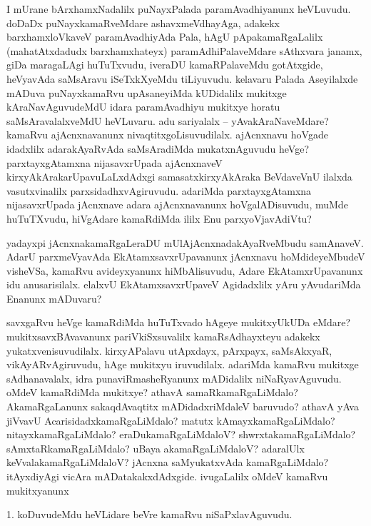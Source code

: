 \begin{artha}
I mUrane bArxhamxNadalilx puNayxPalada paramAvadhiyanunx heVLuvudu. doDaDx puNayxkamaRveMdare ashavxmeVdhayAga, adakekx barxhamxloVkaveV paramAvadhiyAda Pala, hAgU pApakamaRgaLalilx (mahatAtxdadudx barxhamxhateyx) paramAdhiPalaveMdare sAthxvara janamx, giDa maragaLAgi huTuTxvudu, iveraDU kamaRPalaveMdu gotAtxgide, heVyavAda saMsAravu iSeTxkXyeMdu tiLiyuvudu. kelavaru Palada Aseyilalxde mADuva puNayxkamaRvu upAsaneyiMda kUDidalilx mukitxge kAraNavAguvudeMdU idara paramAvadhiyu mukitxye horatu saMsAravalalxveMdU heVLuvaru. adu sariyalalx -- yAvakAraNaveMdare? kamaRvu ajAcnxnavanunx nivaqtitxgoLisuvudilalx. ajAcnxnavu hoVgade idadxlilx adarakAyaRvAda saMsAradiMda mukatxnAguvudu heVge? parxtayxgAtamxna nijasavxrUpada ajAcnxnaveV kirxyAkArakarUpavuLaLxdAdxgi samasatxkirxyAkAraka BeVdaveVnU ilalxda vasutxvinalilx parxsidadhxvAgiruvudu. adariMda parxtayxgAtamxna nijasavxrUpada jAcnxnave adara ajAcnxnavanunx hoVgalADisuvudu, muMde huTuTXvudu, hiVgAdare kamaRdiMda ililx Enu parxyoVjavAdiVtu?

yadayxpi jAcnxnakamaRgaLeraDU mUlAjAcnxnadakAyaRveMbudu  samAnaveV. AdarU parxmeVyavAda EkAtamxsavxrUpavanunx jAcnxnavu hoMdideyeMbudeV visheVSa, kamaRvu avideyxyanunx hiMbAlisuvudu, Adare EkAtamxrUpavanunx idu anusarisilalx. elalxvU EkAtamxsavxrUpaveV Agidadxlilx yAru yAvudariMda Enanunx mADuvaru?
\end{artha}

\centerline{}

\begin{artha}
savxgaRvu heVge kamaRdiMda huTuTxvado hAgeye mukitxyUkUDa eMdare? mukitxsavxBAvavanunx pariVkiSxsuvalilx kamaRsAdhayxteyu adakekx yukatxvenisuvudilalx. kirxyAPalavu utApxdayx, pArxpayx, saMsAkxyaR, vikAyARvAgiruvudu, hAge mukitxyu iruvudilalx. adariMda kamaRvu mukitxge sAdhanavalalx, idra punaviRmasheRyanunx mADidalilx niNaRyavAguvudu. oMdeV kamaRdiMda mukitxye? athavA samaRkamaRgaLiMdalo? AkamaRgaLanunx sakaqdAvaqtitx mADidadxriMdaleV  baruvudo? athavA yAva jiVvavU AcarisidadxkamaRgaLiMdalo? matutx kAmayxkamaRgaLiMdalo? nitayxkamaRgaLiMdalo? eraDukamaRgaLiMdaloV? shwrxtakamaRgaLiMdalo? sAmxtaRkamaRgaLiMdalo? uBaya akamaRgaLiMdaloV? adaralUlx keVvalakamaRgaLiMdaloV? jAcnxna saMyukatxvAda kamaRgaLiMdalo? itAyxdiyAgi vicAra mADatakakxdAdxgide. ivugaLalilx oMdeV kamaRvu mukitxyanunx 
\end{artha}

\begin{artha}
1. koDuvudeMdu heVLidare beVre kamaRvu niSaPxlavAguvudu.
\end{artha}

